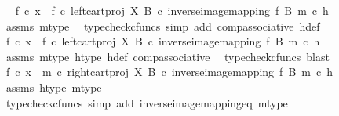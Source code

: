 \begin{isabellebody}
\ \isamarkupfalse%
\ {\isachardoublequoteopen}f\ {\isasymcirc}\isactrlsub c\ x\ {\isacharequal}{\kern0pt}\ f\ {\isasymcirc}\isactrlsub c\ left{\isacharunderscore}{\kern0pt}cart{\isacharunderscore}{\kern0pt}proj\ X\ B\ {\isasymcirc}\isactrlsub c\ inverse{\isacharunderscore}{\kern0pt}image{\isacharunderscore}{\kern0pt}mapping\ f\ B\ m\ {\isasymcirc}\isactrlsub c\ h{\isachardoublequoteclose}\isanewline
\ \ \ \ \isamarkupfalse%
\ assms\ m{\isacharunderscore}{\kern0pt}type\ \isamarkupfalse%
\ {\isacharparenleft}{\kern0pt}typecheck{\isacharunderscore}{\kern0pt}cfuncs{\isacharcomma}{\kern0pt}\ simp\ add{\isacharcolon}{\kern0pt}\ comp{\isacharunderscore}{\kern0pt}associative{}\ h{\isacharunderscore}{\kern0pt}def{\isacharparenright}{\kern0pt}\isanewline
\ \ \isamarkupfalse%
\ \isamarkupfalse%
\ {\isachardoublequoteopen}f\ {\isasymcirc}\isactrlsub c\ x\ {\isacharequal}{\kern0pt}\ {\isacharparenleft}{\kern0pt}f\ {\isasymcirc}\isactrlsub c\ left{\isacharunderscore}{\kern0pt}cart{\isacharunderscore}{\kern0pt}proj\ X\ B\ {\isasymcirc}\isactrlsub c\ inverse{\isacharunderscore}{\kern0pt}image{\isacharunderscore}{\kern0pt}mapping\ f\ B\ m{\isacharparenright}{\kern0pt}\ {\isasymcirc}\isactrlsub c\ h{\isachardoublequoteclose}\isanewline
\ \ \ \ \isamarkupfalse%
\ assms\ m{\isacharunderscore}{\kern0pt}type\ h{\isacharunderscore}{\kern0pt}type\ h{\isacharunderscore}{\kern0pt}def\ comp{\isacharunderscore}{\kern0pt}associative{}\ \isamarkupfalse%
\ {\isacharparenleft}{\kern0pt}typecheck{\isacharunderscore}{\kern0pt}cfuncs{\isacharcomma}{\kern0pt}\ blast{\isacharparenright}{\kern0pt}\isanewline
\ \ \isamarkupfalse%
\ \isamarkupfalse%
\ {\isachardoublequoteopen}f\ {\isasymcirc}\isactrlsub c\ x\ {\isacharequal}{\kern0pt}\ {\isacharparenleft}{\kern0pt}m\ {\isasymcirc}\isactrlsub c\ right{\isacharunderscore}{\kern0pt}cart{\isacharunderscore}{\kern0pt}proj\ X\ B\ {\isasymcirc}\isactrlsub c\ inverse{\isacharunderscore}{\kern0pt}image{\isacharunderscore}{\kern0pt}mapping\ f\ B\ m{\isacharparenright}{\kern0pt}\ {\isasymcirc}\isactrlsub c\ h{\isachardoublequoteclose}\isanewline
\ \ \ \ \isamarkupfalse%
\ assms\ h{\isacharunderscore}{\kern0pt}type\ m{\isacharunderscore}{\kern0pt}type\ \isamarkupfalse%
\ {\isacharparenleft}{\kern0pt}typecheck{\isacharunderscore}{\kern0pt}cfuncs{\isacharcomma}{\kern0pt}\ simp\ add{\isacharcolon}{\kern0pt}\ inverse{\isacharunderscore}{\kern0pt}image{\isacharunderscore}{\kern0pt}mapping{\isacharunderscore}{\kern0pt}eq\ m{\isacharunderscore}{\kern0pt}type{\isacharparenright}{\kern0pt}\isanewline

\end{isabellebody}

